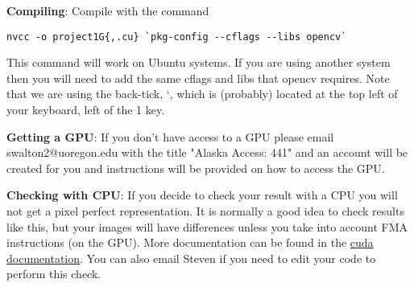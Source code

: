 \documentclass[12pt,letter]{article}
\begin{document}
\textbf{Compiling}: Compile with the command
\begin{lstlisting}
nvcc -o project1G{,.cu} `pkg-config --cflags --libs opencv`
\end{lstlisting}
This command will work on Ubuntu systems. If you are using another system then
you will need to add the same cflags and libs that opencv requires. 
Note that we are using the back-tick, `, which is (probably) located at the top
left of your keyboard, left of the 1 key.


\textbf{Getting a GPU}: If you don't have access to a GPU please email
swalton2@uoregon.edu with the title "Alaska Access: 441" and an account will
be created for you and instructions will be provided on how to access the GPU.


\textbf{Checking with CPU}: If you decide to check your result with a CPU you
will not get a pixel perfect representation. It is normally a good idea to check
results like this, but your images will have differences unless you take into
account FMA instructions (on the GPU). More documentation can be found in
the \href{https://docs.nvidia.com/cuda/floating-point/index.html#axzz42SnDmIrm}{cuda documentation}. You can also email Steven if you need to edit your code to 
perform this check. 
\end{document}
